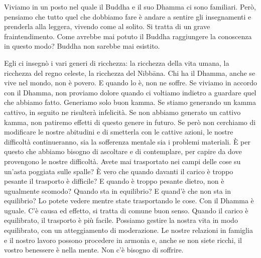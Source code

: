 Viviamo in un posto nel quale il Buddha e il suo Dhamma ci sono
familiari. Però, pensiamo che tutto quel che dobbiamo fare è andare a
sentire gli insegnamenti e prenderla alla leggera, vivendo come al
solito. Si tratta di un grave fraintendimento. Come avrebbe mai potuto
il Buddha raggiungere la conoscenza in questo modo? Buddha non sarebbe
mai esistito.

Egli ci insegnò i vari generi di ricchezza: la ricchezza della vita
umana, la ricchezza del regno celeste, la ricchezza del Nibbāna.
Chi ha il Dhamma, anche se vive nel mondo, non è povero. E quando lo è,
non ne soffre. Se viviamo in accordo con il Dhamma, non proviamo dolore
quando ci voltiamo indietro a guardare quel che abbiamo fatto. Generiamo
solo buon kamma. Se stiamo generando un kamma cattivo, in
seguito ne risulterà infelicità. Se non abbiamo generato un cattivo
kamma, non patiremo effetti di questo genere in futuro. Se però
non cerchiamo di modificare le nostre abitudini e di smetterla con le
cattive azioni, le nostre difficoltà continueranno, sia la sofferenza
mentale sia i problemi materiali. È per questo che abbiamo bisogno di
ascoltare e di contemplare, per capire da dove provengono le nostre
difficoltà. Avete mai trasportato nei campi delle cose su un'asta
poggiata sulle spalle? È vero che quando davanti il carico è troppo
pesante il trasporto è difficile? E quando è troppo pesante dietro, non
è ugualmente scomodo? Quando sta in equilibrio? E quand'è che non sta in
equilibrio? Lo potete vedere mentre state trasportando le cose. Con il
Dhamma è uguale. C'è causa ed effetto, si tratta di comune buon senso.
Quando il carico è equilibrato, il trasporto è più facile. Possiamo
gestire la nostra vita in modo equilibrato, con un atteggiamento di
moderazione. Le nostre relazioni in famiglia e il nostro lavoro possono
procedere in armonia e, anche se non siete ricchi, il vostro benessere è
nella mente. Non c'è bisogno di soffrire.

